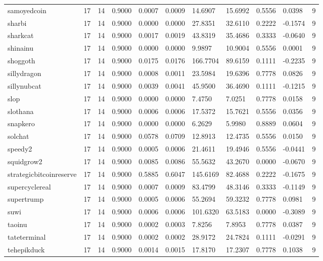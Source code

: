 \begin{table}[htbp]
\begin{tabular}{lllllllllll}
samoyedcoin & 17 & 14 & 0.9000 & 0.0007 & 0.0009 & 14.6907 & 15.6992 & 0.5556 & 0.0398 & 9 \\
sharbi & 17 & 14 & 0.9000 & 0.0000 & 0.0000 & 27.8351 & 32.6110 & 0.2222 & -0.1574 & 9 \\
sharkcat & 17 & 14 & 0.9000 & 0.0017 & 0.0019 & 43.8319 & 35.4686 & 0.3333 & -0.0640 & 9 \\
shinainu & 17 & 14 & 0.9000 & 0.0000 & 0.0000 & 9.9897 & 10.9004 & 0.5556 & 0.0001 & 9 \\
shoggoth & 17 & 14 & 0.9000 & 0.0175 & 0.0176 & 166.7704 & 89.6159 & 0.1111 & -0.2235 & 9 \\
sillydragon & 17 & 14 & 0.9000 & 0.0008 & 0.0011 & 23.5984 & 19.6396 & 0.7778 & 0.0826 & 9 \\
sillynubcat & 17 & 14 & 0.9000 & 0.0039 & 0.0041 & 45.9500 & 36.4690 & 0.1111 & -0.1215 & 9 \\
slop & 17 & 14 & 0.9000 & 0.0000 & 0.0000 & 7.4750 & 7.0251 & 0.7778 & 0.0158 & 9 \\
slothana & 17 & 14 & 0.9000 & 0.0006 & 0.0006 & 17.5372 & 15.7621 & 0.5556 & 0.0356 & 9 \\
snapkero & 17 & 14 & 0.9000 & 0.0000 & 0.0000 & 6.2629 & 5.9980 & 0.8889 & 0.0604 & 9 \\
solchat & 17 & 14 & 0.9000 & 0.0578 & 0.0709 & 12.8913 & 12.4735 & 0.5556 & 0.0150 & 9 \\
speedy2 & 17 & 14 & 0.9000 & 0.0005 & 0.0006 & 21.4611 & 19.4946 & 0.5556 & -0.0441 & 9 \\
squidgrow2 & 17 & 14 & 0.9000 & 0.0085 & 0.0086 & 55.5632 & 43.2670 & 0.0000 & -0.0670 & 9 \\
strategicbitcoinreserve & 17 & 14 & 0.9000 & 0.5885 & 0.6047 & 145.6169 & 82.4688 & 0.2222 & -0.1675 & 9 \\
supercyclereal & 17 & 14 & 0.9000 & 0.0007 & 0.0009 & 83.4799 & 48.3146 & 0.3333 & -0.1149 & 9 \\
supertrump & 17 & 14 & 0.9000 & 0.0005 & 0.0006 & 55.2694 & 59.3232 & 0.7778 & 0.0981 & 9 \\
suwi & 17 & 14 & 0.9000 & 0.0006 & 0.0006 & 101.6320 & 63.5183 & 0.0000 & -0.3089 & 9 \\
taoinu & 17 & 14 & 0.9000 & 0.0002 & 0.0003 & 7.8256 & 7.8953 & 0.7778 & 0.0387 & 9 \\
tateterminal & 17 & 14 & 0.9000 & 0.0002 & 0.0002 & 28.9172 & 24.7824 & 0.1111 & -0.0291 & 9 \\
tehepikduck & 17 & 14 & 0.9000 & 0.0014 & 0.0015 & 17.8170 & 17.2307 & 0.7778 & 0.1038 & 9 \\

\end{tabular}
\end{table}
